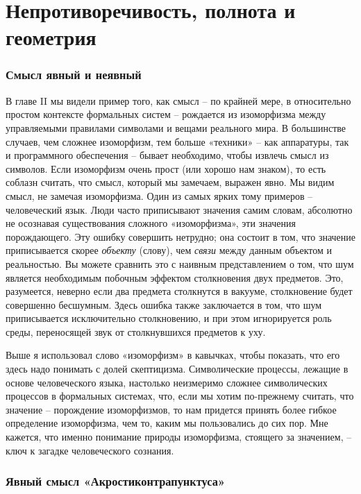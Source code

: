 \documentclass[../main.tex]{subfiles}
\begin{document}
\chapter{Непротиворечивость, полнота и геометрия}

\subsection{Смысл явный и неявный}

В главе II мы видели пример того, как смысл \--- по крайней мере, в относительно простом контексте формальных систем \--- рождается из изоморфизма между управляемыми правилами символами и вещами реального мира. В большинстве случаев, чем сложнее изоморфизм, тем больше «техники» \--- как аппаратуры, так и программного обеспечения \--- бывает необходимо, чтобы извлечь смысл из символов. Если изоморфизм очень прост (или хорошо нам знаком), то есть соблазн считать, что смысл, который мы замечаем, выражен явно. Мы видим смысл, не замечая изоморфизма. Один из самых ярких тому примеров \--- человеческий язык. Люди часто приписывают значения самим словам, абсолютно не осознавая существования сложного «изоморфизма», эти значения порождающего. Эту ошибку совершить нетрудно; она состоит в том, что значение приписывается скорее \emph{объекту} (слову), чем \emph{связи} между данным объектом и реальностью. Вы можете сравнить это с наивным представлением о том, что шум является необходимым побочным эффектом столкновения двух предметов. Это, разумеется, неверно если два предмета столкнутся в вакууме, столкновение будет совершенно бесшумным. Здесь ошибка также заключается в том, что шум приписывается исключительно столкновению, и при этом игнорируется роль среды, переносящей звук от столкнувшихся предметов к уху.

Выше я использовал слово «изоморфизм» в кавычках, чтобы показать, что его здесь надо понимать с долей скептицизма. Символические процессы, лежащие в основе человеческого языка, настолько неизмеримо сложнее символических процессов в формальных системах, что, если мы хотим по-прежнему считать, что значение \--- порождение изоморфизмов, то нам придется принять более гибкое определение изоморфизма, чем то, каким мы пользовались до сих пор. Мне кажется, что именно понимание природы изоморфизма, стоящего за значением, \--- ключ к загадке человеческого сознания.


\subsection{Явный смысл «Акростиконтрапунктуса»}
\end{document}
